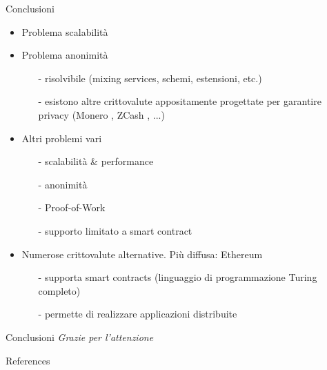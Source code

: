 \documentclass{beamer}
\begin{document}
  
  \begin{frame}{Conclusioni}
     \begin{itemize}
          \item Problema scalabilità
          \item Problema anonimità 
          \begin{itemize}
              \item[-] risolvibile (mixing services, schemi, estensioni, etc.) 
              \item[-] esistono altre crittovalute appositamente progettate per garantire privacy (Monero \cite{getmonero}, ZCash \cite{zcash}, ...)  
          \end{itemize}
          \item Altri problemi vari
          \begin{itemize}
              \item[-] scalabilità \& performance
              \item[-] anonimità 
              \item[-] Proof-of-Work
              \item[-] supporto limitato a smart contract 
          \end{itemize}
          \pause
          \item Numerose crittovalute alternative. Più diffusa: Ethereum
          \begin{itemize}
              \item[-] supporta smart contracts (linguaggio di programmazione Turing completo)
              \item[-] permette di realizzare applicazioni distribuite 
          \end{itemize}
      \end{itemize}
  \end{frame}
  
  \begin{frame}{Conclusioni}
      \centering \Huge
      \emph{Grazie per l'attenzione}
  \end{frame}
  


  \begin{frame}[allowframebreaks]{References}
    \printbibliography
  \end{frame}
\end{document}
